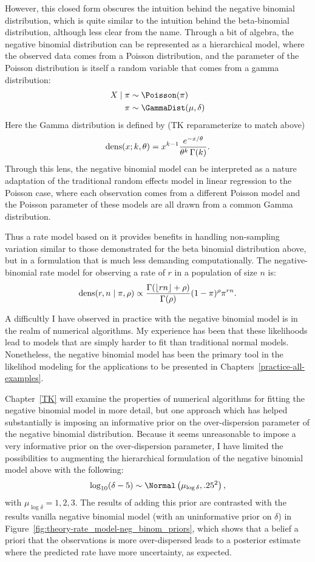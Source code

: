 However, this closed form obscures the intuition behind the negative
binomial distribution, which is quite similar to the intuition behind
the beta-binomial distribution, although less clear from the
name. Through a bit of algebra, the negative binomial distribution can
be represented as a hierarchical model, where the observed data comes
from a Poisson distribution, and the parameter of the Poisson
distribution is itself a random variable that comes from a gamma
distribution:
\begin{align*}
X\given \pi &\sim \Poisson(\pi)\\
\pi &\sim \GammaDist(\mu, \delta)
\end{align*}
Here the Gamma distribution is defined by (TK reparameterize to match above)
\[
\operatorname{dens}(x; k,\theta) =
x^{k-1} \frac{e^{-x/\theta}}{\theta^k \, \Gamma(k)}.
\]
Through this lens, the negative binomial model can be interpreted as a
nature adaptation of the traditional random effects model in linear
regression to the Poisson case, where each observation comes from a
different Poisson model and the Poisson parameter of these models are
all drawn from a common Gamma distribution.

Thus a rate model based on it provides benefits in handling
non-sampling variation similar to those demonstrated for the beta
binomial distribution above, but in a formulation that is much less
demanding computationally.  The negative-binomial rate model for
observing a rate of $r$ in a population of size $n$ is:
\[
\operatorname{dens}(r,n\;|\; \pi, \rho) \propto \frac{\Gamma(\lfloor rn\rfloor+\rho)}{\Gamma(\rho)} (1-\pi)^\rho \pi^{rn}.
\]

A difficultly I have observed in practice with the negative binomial
model is in the realm of numerical algorithms.  My experience has been that these
likelihoods lead to models that are simply harder to fit than
traditional normal models.  Nonetheless, the negative binomial model
has been the primary tool in the likelihod modeling for the
applications to be presented in Chapters~\ref{practice-all-examples}.

Chapter~\ref{TK} will examine the properties of numerical algorithms
for fitting the negative binomial model in more detail, but one
approach which has helped substantially is imposing an informative
prior on the over-dispersion parameter of the negative binomial
distribution.  Because it seems unreasonable to impose a very
informative prior on the over-dispersion parameter, I have limited the
possibilities to augmenting the hierarchical formulation of the
negative binomial model above with the following:
\[
\log_{10} (\delta-5) \sim \Normal\left(\mu_{\log\delta}, .25^2\right),
\]
with $\mu_{\log\delta} = 1, 2, 3$.  The results of adding this
prior are contrasted with the results vanilla negative binomial model
(with an uninformative prior on $\delta$) in
Figure~\ref{fig:theory-rate_model-neg_binom_priors}, which shows that
a belief a priori that the observations is more over-dispersed leads
to a posterior estimate where the predicted rate have more
uncertainty, as expected.

